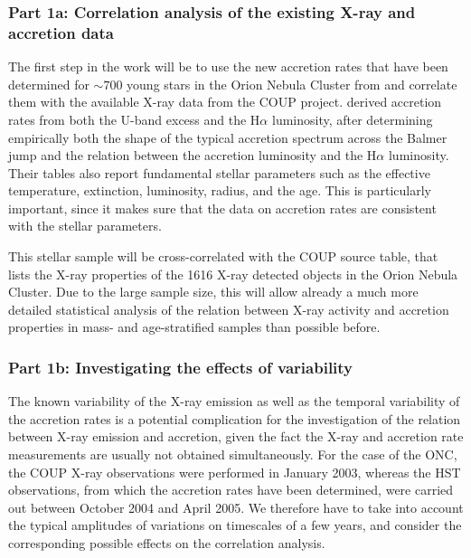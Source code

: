 \documentclass[10pt,fleqn,twoside]{article}
\begin{document}
\subsubsection*{Part 1a: Correlation analysis of the existing X-ray and accretion data}

The first step in the work will be to use the new accretion rates
that have been  determined for $\sim 700$ young stars
in the Orion Nebula Cluster from \citet{Manara12} and correlate them
with the available X-ray data from the COUP project.
%
\citet{Manara12} derived accretion rates from both the U-band excess and the H$\alpha$ luminosity,
after determining empirically both the shape of the typical accretion spectrum across the
Balmer jump and the relation between the accretion luminosity and the  
H$\alpha$ luminosity.
Their tables also report fundamental stellar parameters such as the
effective temperature, extinction, luminosity, radius, and the age. This is
particularly important, since it makes sure that the data on accretion rates are
consistent with the stellar parameters.

This stellar sample will be cross-correlated with the
COUP source table, that lists the X-ray properties of the 1616 X-ray detected objects
in the Orion Nebula Cluster. Due to the large sample size,
this will allow already a much more detailed statistical analysis of the relation between
X-ray activity and accretion properties in mass- and age-stratified samples
than possible before.



\subsubsection*{Part 1b: Investigating the effects of variability}

The known variability of the X-ray emission as well as the 
temporal variability of the accretion rates is a potential 
complication  for the investigation of the relation between
X-ray emission and accretion, given the fact the X-ray and
accretion rate measurements are usually not obtained simultaneously.
For the case of the ONC, the COUP X-ray observations were performed 
in January 2003, whereas the HST observations, from which the accretion rates
have been determined, were carried out 
between October 2004 and April 2005.
%
We therefore have to take into account the typical amplitudes
of variations on timescales of a few years, and consider
the corresponding possible effects on the correlation analysis.
\end{document}
